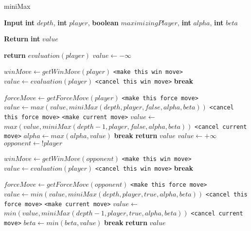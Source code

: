 \documentclass[a4paper]{article}
\begin{document}
\begin{algorithm}
\caption{miniMax}
\begin{algorithmic}[]

\State \textbf{Input} \textbf{int} $depth$, \textbf{int} $player$, \textbf{boolean} $maximizingPlayer$, \textbf{int} $alpha$, \textbf{int} $beta$

\State \textbf{Return} \textbf{int} $value$

 
	\State \textbf{return} $evaluation(player)$  
\EndIf
{}  
	\State $value \gets -\infty$
        	
		\State $ winMove \gets getWinMove(player)$  
    			\State  \texttt{<make this win move>}
   			\State   $value \gets evaluation(player)$
     			\State \texttt{<cancel this win move>}  
			\State \textbf{break}
		\EndIf

		\State $ forceMove \gets getForceMove(player)$  
    			\State  \texttt{<make this force move>}
   		 	\State   $value \gets max(value, miniMax(depth, player, false, alpha, beta))$
     			\State \texttt{<cancel this force move>}  
		\Else
			\State \texttt{<make current move>}
			\State   $value \gets   $
			\State $ max(value, miniMax(depth-1, player, false, alpha, beta))$
			\State \texttt{<cancel current move>}  
			\State $alpha \gets max(alpha, value) $
				\State \textbf{break}
			\EndIf
		\EndIf	    
      \EndFor  
	\State \textbf{return} $value$
\Else  {}
	\State $value \gets +\infty$
	\State $opponent \gets !player$
        	
		\State $ winMove \gets getWinMove(opponent)$  
    			\State  \texttt{<make this win move>}
   			\State   $value \gets evaluation(player)$
     			\State \texttt{<cancel this win move>}  
			\State \textbf{break}
		\EndIf

		\State $ forceMove \gets getForceMove(opponent)$  
    			\State  \texttt{<make this force move>}
   		 	\State   $value \gets min(value, miniMax(depth, player, true, alpha, beta))$
     			\State \texttt{<cancel this force move>}  
		\Else
			\State \texttt{<make current move>}
			\State   $value \gets   $
			\State $ min(value, miniMax(depth-1, player, true, alpha, beta))$
			\State \texttt{<cancel current move>}  
			\State $beta \gets min(beta, value) $
				\State \textbf{break}
			\EndIf
		\EndIf	    
      \EndFor  
	\State \textbf{return} $value$
\EndIf


\EndProcedure
\end{algorithmic}
\end{algorithm}
\end{document}
